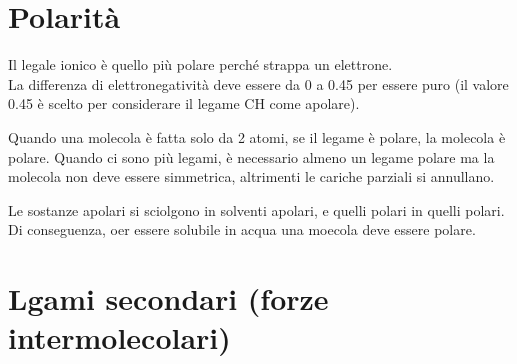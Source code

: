 \documentclass[a4paper]{article}
\begin{document}




\pagebreak



\section{Polarità}

Il legale ionico è quello più polare perché strappa un elettrone. \\
La differenza di elettronegatività deve essere da 0 a 0.45 per essere puro
(il valore 0.45 è scelto per considerare il legame CH come apolare).

Quando una molecola è fatta solo da 2 atomi, 
se il legame è polare, la molecola è polare.
Quando ci sono più legami, è necessario almeno un legame polare
ma la molecola non deve essere simmetrica, altrimenti le cariche parziali si annullano.

Le sostanze apolari si sciolgono in solventi apolari, e quelli polari in quelli polari.
Di conseguenza, oer essere solubile in acqua una moecola deve essere polare.


\section{Lgami secondari (forze intermolecolari)}

\end{document}
